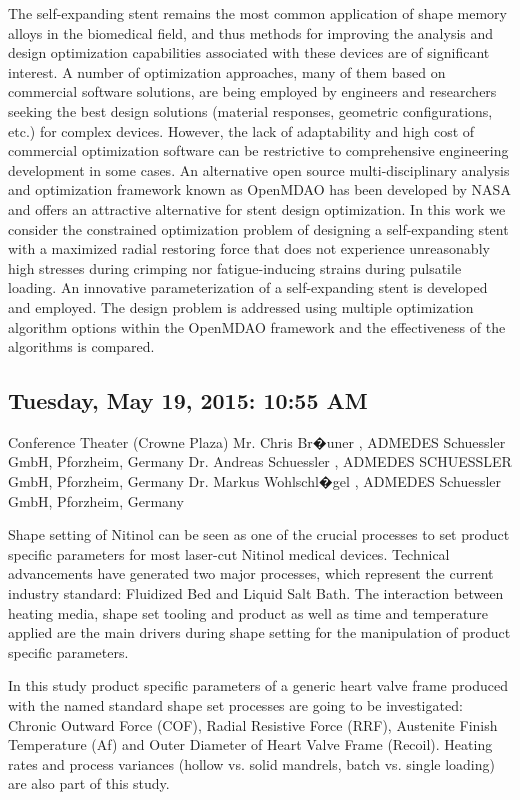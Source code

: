 \documentclass[12pt, a4paper]{article}
\begin{document}
\noindent The self-expanding stent remains the most common application of shape memory alloys in the biomedical field, and thus methods for improving the analysis and design optimization capabilities associated with these devices are of significant interest. A number of optimization approaches, many of them based on commercial software solutions, are being employed by engineers and researchers seeking the best design solutions (material responses, geometric configurations, etc.) for complex devices. However, the lack of adaptability and high cost of commercial optimization software can be restrictive to comprehensive engineering development in some cases. An alternative open source multi-disciplinary analysis and optimization framework known as OpenMDAO has been developed by NASA and offers an attractive alternative for stent design optimization. In this work we consider the constrained optimization problem of designing a self-expanding stent with a maximized radial restoring force that does not experience unreasonably high stresses during crimping nor fatigue-inducing strains during pulsatile loading. An innovative parameterization of a self-expanding stent is developed and employed. The design problem is addressed using multiple optimization algorithm options within the OpenMDAO framework and the effectiveness of the algorithms is compared.

\subsection*{Tuesday, May 19, 2015: 10:55 AM}
Conference Theater (Crowne Plaza)
Mr. Chris Br�uner , ADMEDES Schuessler GmbH, Pforzheim, Germany
Dr. Andreas Schuessler , ADMEDES SCHUESSLER GmbH, Pforzheim, Germany
Dr. Markus Wohlschl�gel , ADMEDES Schuessler GmbH, Pforzheim, Germany

\noindent Shape setting of Nitinol can be seen as one of the crucial processes to set product specific parameters for most laser-cut Nitinol medical devices. Technical advancements have generated two major processes, which represent the current industry standard: Fluidized Bed and Liquid Salt Bath. 
The interaction between heating media, shape set tooling and product as well as time and temperature applied are the main drivers during shape setting for the manipulation of product specific parameters.

In this study product specific parameters of a generic heart valve frame produced with the named standard shape set processes are going to be investigated: Chronic Outward Force (COF), Radial Resistive Force (RRF), Austenite Finish Temperature (Af) and Outer Diameter of Heart Valve Frame (Recoil). Heating rates and process variances (hollow vs. solid mandrels, batch vs. single loading) are also part of this study.
\end{document}
